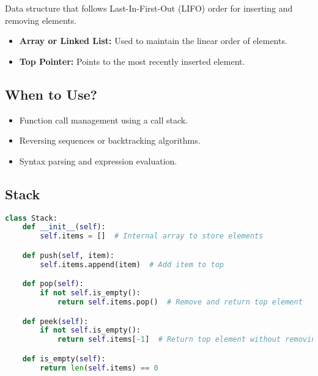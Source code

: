 \begin{summary}
    Data structure that follows Last-In-First-Out (LIFO) order for inserting and removing elements.
    \begin{itemize}
        \item \textbf{Array or Linked List:} Used to maintain the linear order of elements.
        \item \textbf{Top Pointer:} Points to the most recently inserted element.
    \end{itemize}    
\end{summary}

\subsection{When to Use?}
\begin{summary}
    \begin{itemize}
        \item Function call management using a call stack.
        \item Reversing sequences or backtracking algorithms.
        \item Syntax parsing and expression evaluation.
    \end{itemize}
\end{summary}

\subsection{Stack}
\begin{algo}
\begin{lstlisting}[language=Python]
class Stack:
    def __init__(self):
        self.items = []  # Internal array to store elements

    def push(self, item):
        self.items.append(item)  # Add item to top

    def pop(self):
        if not self.is_empty():
            return self.items.pop()  # Remove and return top element

    def peek(self):
        if not self.is_empty():
            return self.items[-1]  # Return top element without removing

    def is_empty(self):
        return len(self.items) == 0
\end{lstlisting}
\end{algo}

